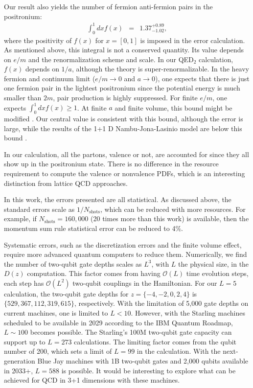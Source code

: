 \documentclass[aps,prd,twocolumn,tightenlines,superscriptaddress,
nofootinbib,preprintnumbers]{revtex4-1}
\newcommand{\Blue}[1]{\textcolor{black}{#1}}
\begin{document}
Our result also yields the number of fermion anti-fermion pairs in the positronium:
\begin{eqnarray}
\label{pair}
   \int_{0}^{1}dx f(x) &=&1.37^{+0.89}_{-1.02} ,
\end{eqnarray}
where the positivity of $f(x)$ for $x=[0,1]$ is imposed in the error calculation.
As mentioned above, this integral is not a conserved quantity. Its value depends on $e/m$ and the renormalization scheme and scale. In our QED$_2$ calculation, $f(x)$ depends on $1/a$, although the theory is super-renormalizable. In the heavy fermion and continuum limit ($e/m \to 0$ and  $a \to 0$), one expects that there is just one fermion pair in the lightest positronium since the potential energy is much smaller than $2m$, pair production is highly suppressed. 
For finite $e/m$, one expects $\int_{0}^{1}dx f(x) \ge 1$. At finite $a$ and finite volume, this bound might be modified \cite{Banuls:2025wiq}. 
Our central value is consistent with this bound, although the error is large, while
the results of the 1+1 D Nambu-Jona-Lasinio model are below this bound \cite{Li:2021kcs,Kang:2025xpz}. 

In our calculation, all the partons, valence or not, are accounted for since they all show up in the positronium state. There is no
difference
in the resource requirement to compute the valence or nonvalence PDFs, which is an interesting distinction from lattice QCD approaches.

In this work, the errors presented are all statistical. As discussed above, the standard errors scale as $1/N_{\text{shots}}$, which can be reduced with more resources. For example, if $N_{\text{shots}}=160,000$ (20 times more than this work) is available, then the momentum sum rule statistical error can be reduced to 4\%. 

Systematic errors, such as the discretization errors and the finite volume effect, require more advanced quantum computers to reduce them. Numerically, we find the number of two-qubit gate depths scales as $L^3$, with $L$ the physical size, in the $D(z)$ computation. This factor comes from having $\mathcal{O}(L)$ time evolution steps, each step has $\mathcal{O}(L^2)$ two-qubit couplings in the Hamiltonian. For our $L=5$ calculation, the two-qubit gate depths for $z=\{-4,-2,0,2,4\}$ is
$\{529, 367, 112, 319, 615\}$, respectively. With the limitation of 5,000 gate depths on current machines, one is limited to $L<10$. However, with the Starling machines scheduled to be available in 2029 according to the IBM Quantum Roadmap,  $L\sim 100$ becomes possible. The Starling's 100M two-qubit gate capacity
can support up to $L=273$ calculations. The limiting factor comes from the qubit number of 200, which sets a limit of $L=99$ in the calculation. With the next-generation Blue Jay machines with 1B two-qubit gates and 2,000 qubits available in 2033+, $L=588$ is possible. It would be interesting to explore what can be achieved for QCD in 3+1 dimensions with these machines. 
\end{document}
